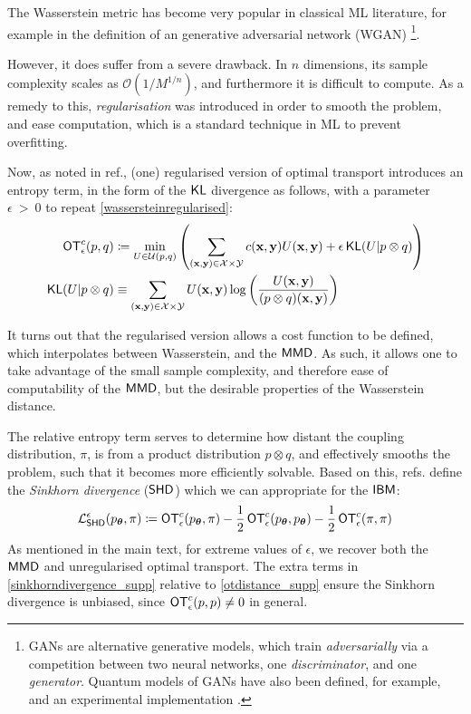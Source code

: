 \noindent The Wasserstein metric has become very popular in classical ML literature, for example in the definition of an generative adversarial network (WGAN) \footnote{GANs are alternative generative models, which train \textit{adversarially} via a competition between two neural networks, one \textit{discriminator}, and one \textit{generator}. Quantum models of GANs have also been defined, for example,  and an experimental implementation .}. 

However, it does suffer from a severe drawback. In $n$ dimensions, its sample complexity scales as $\mathcal{O}(1/M^{1/n})$, and furthermore it is difficult to compute. As a remedy to this, \textit{regularisation} was introduced in order to smooth the problem, and ease computation, which is a standard technique in ML to prevent overfitting.

Now, as noted in ref., (one) regularised version of optimal transport introduces an entropy term, in the form of the $\operatorname{\textsf{KL}}$ divergence as follows, with a parameter $\epsilon~>~0$ to repeat \eqref{wassersteinregularised}:
\begin{align}
\operatorname{\textsf{OT}}^c_\epsilon(p, q) & \coloneqq  \min\limits_{U \in \mathcal{U}(p, q)}\left(\sum\limits_{(\mathbf{x}, \mathbf{y}) \in \mathcal{X}\times\mathcal{Y}} c(\mathbf{x}, \mathbf{y})U(\mathbf{x}, \mathbf{y}) + \epsilon \operatorname{\textsf{KL}}(U|p \otimes q)\right) \label{wassersteinregularised_supp}\\
\operatorname{\textsf{KL}}(U|p \otimes q) &\equiv \sum\limits_{(\mathbf{x}, \mathbf{y}) \in \mathcal{X}\times\mathcal{Y}} U(\mathbf{x}, \mathbf{y}) \log\left(\frac{U(\mathbf{x}, \mathbf{y})}{(p\otimes q )(\mathbf{x}, \mathbf{y})}\right)
\end{align}


\noindent It turns out that the regularised version allows a cost function to be defined, which interpolates between Wasserstein, and the $\operatorname{\textsf{MMD}}$. As such, it allows one to take advantage of the small sample complexity, and therefore ease of computability of the $\operatorname{\textsf{MMD}}$, but the desirable properties of the Wasserstein distance.

The relative entropy term serves to determine how distant the coupling distribution, $\pi$, is from a product distribution $p\otimes q$,  and effectively smooths the problem, such that it becomes more efficiently solvable. Based on this, refs. define the \textit{Sinkhorn divergence} ($\operatorname{\textsf{SHD}}$) which we can appropriate for the $\textsf{IBM}$:
\begin{align}
    \mathcal{L}_{\operatorname{\textsf{SHD}}}^\epsilon(p_{\boldsymbol\theta}, \pi)  \coloneqq \operatorname{\textsf{OT}}^c_\epsilon(p_{\boldsymbol\theta}, \pi) - \frac{1}{2} \operatorname{\textsf{OT}}^c_\epsilon(p_{\boldsymbol\theta}, p_{\boldsymbol\theta}) -\frac{1}{2}\operatorname{\textsf{OT}}^c_\epsilon(\pi, \pi) \label{sinkhorndivergence_supp}
\end{align}
As mentioned in the main text, for extreme values of $\epsilon$, we recover both the $\operatorname{\textsf{MMD}}$ and unregularised optimal transport. The extra terms in \eqref{sinkhorndivergence_supp} relative to \eqref{otdistance_supp} ensure the Sinkhorn divergence is unbiased, since $\operatorname{\textsf{OT}}^c_\epsilon(p, p) \neq 0$ in general.

